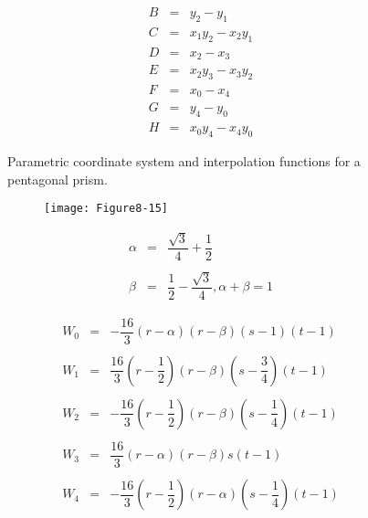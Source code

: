 \begin{figure}[!htb]
\begin{subfigure}{0.48\linewidth}
\begin{equation*}
\begin{array}{lll}
		B &=& y_2 - y_1 \\
		C &=& x_1 y_2 - x_2 y_1 \\
		D &=& x_2 - x_3 \\
		E &=& x_2 y_3 - x_3 y_2 \\
		F &=& x_0 - x_4 \\
		G &=& y_4 - y_0 \\
		H &=& x_0 y_4 - x_4 y_0	
		\end{array}
		\end{equation*}
	\end{subfigure}%
	\caption{Parametric coordinate system and interpolation functions for a pentagonal prism.}
	\label{fig:Figure8-14}
\end{figure}

\begin{figure}[!htb]
	\centering
	\begin{subfigure}{0.48\linewidth}
		\centering
		\texttt{[image: Figure8-15]}
		\caption*{}
	\end{subfigure}
	\hfill
	\begin{subfigure}{0.48\linewidth}
		\centering
		\begin{equation*}
		\begin{array}{lll}
		\alpha &=& \dfrac{\sqrt{3}}{4} + \dfrac{1}{2} \\ \\
		\beta &=& \dfrac{1}{2} - \dfrac{\sqrt{3}}{4}, \alpha + \beta = 1
		\end{array}
		\end{equation*}
	\end{subfigure}
	\hfill
	\begin{subfigure}{0.48\linewidth}
		\centering
		\begin{equation*}
		\begin{array}{lll}
		W_0 &=&-\dfrac{16}{3}(r - \alpha)(r - \beta)(s - 1)(t - 1) \\ \\
		W_1 &=&\dfrac{16}{3}(r - \dfrac{1}{2})(r - \beta)(s - \dfrac{3}{4})(t - 1) \\ \\
		W_2 &=& -\dfrac{16}{3}(r - \dfrac{1}{2})(r - \beta)(s - \dfrac{1}{4})(t - 1) \\ \\
		W_3 &=& \dfrac{16}{3}(r - \alpha)(r - \beta)s(t - 1) \\ \\
		W_4 &=& -\dfrac{16}{3}(r - \dfrac{1}{2})(r - \alpha)(s - \dfrac{1}{4})(t - 1) \\ \\

\end{array}
\end{equation*}
\end{subfigure}
\end{figure}
